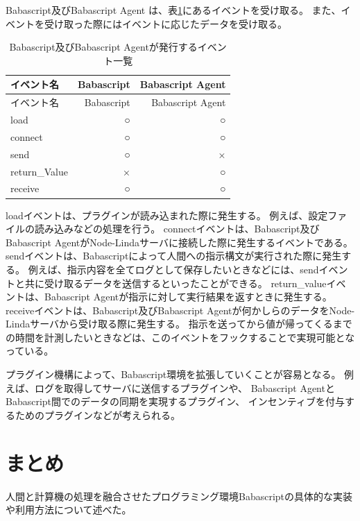 Babascript及びBabascript Agent
は、表\ref{table:plugin-events}にあるイベントを受け取る。
また、イベントを受け取った際にはイベントに応じたデータを受け取る。

\begin{longtable}[c]{@{}lrr@{}}
\caption{Babascript及びBabascript Agentが発行するイベント一覧
\label{table:plugin-events}}\tabularnewline
\toprule
イベント名 & Babascript & Babascript Agent\tabularnewline
\midrule
\endfirsthead
\toprule
イベント名 & Babascript & Babascript Agent\tabularnewline
\midrule
\endhead
load & ○ & ○\tabularnewline
connect & ○ & ○\tabularnewline
send & ○ & ×\tabularnewline
return\_Value & × & ○\tabularnewline
receive & ○ & ○\tabularnewline
\bottomrule
\end{longtable}

loadイベントは、プラグインが読み込まれた際に発生する。
例えば、設定ファイルの読み込みなどの処理を行う。
connectイベントは、Babascript及びBabascript
AgentがNode-Lindaサーバに接続した際に発生するイベントである。
sendイベントは、Babascriptによって人間への指示構文が実行された際に発生する。
例えば、指示内容を全てログとして保存したいときなどには、sendイベントと共に受け取るデータを送信するといったことができる。
return\_valueイベントは、Babascript
Agentが指示に対して実行結果を返すときに発生する。
receiveイベントは、Babascript及びBabascript
Agentが何かしらのデータをNode-Lindaサーバから受け取る際に発生する。
指示を送ってから値が帰ってくるまでの時間を計測したいときなどは、このイベントをフックすることで実現可能となっている。

プラグイン機構によって、Babascript環境を拡張していくことが容易となる。
例えば、ログを取得してサーバに送信するプラグインや、 Babascript
AgentとBabascript間でのデータの同期を実現するプラグイン、
インセンティブを付与するためのプラグインなどが考えられる。

\section{まとめ}\label{ux307eux3068ux3081}

人間と計算機の処理を融合させたプログラミング環境Babascriptの具体的な実装や利用方法について述べた。
